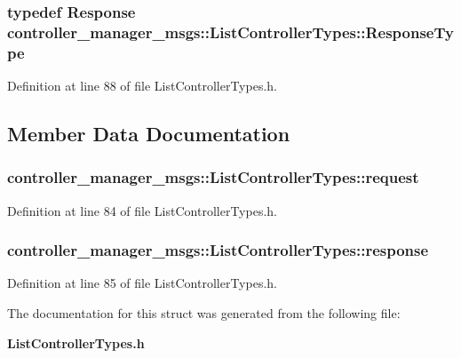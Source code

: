 \subsubsection[{\-Response\-Type}]{\setlength{\rightskip}{0pt plus 5cm}typedef {\bf \-Response} {\bf controller\-\_\-manager\-\_\-msgs\-::\-List\-Controller\-Types\-::\-Response\-Type}}\label{structcontroller__manager__msgs_1_1ListControllerTypes_a3de22e026efaa9f607bea6878ae0cb2e}


\-Definition at line 88 of file \-List\-Controller\-Types.\-h.



\subsection{\-Member \-Data \-Documentation}
\subsubsection[{request}]{ {\bf controller\-\_\-manager\-\_\-msgs\-::\-List\-Controller\-Types\-::request}}\label{structcontroller__manager__msgs_1_1ListControllerTypes_ab8b9a0c0d6d50393009975226e73eb8d}


\-Definition at line 84 of file \-List\-Controller\-Types.\-h.

\subsubsection[{response}]{ {\bf controller\-\_\-manager\-\_\-msgs\-::\-List\-Controller\-Types\-::response}}\label{structcontroller__manager__msgs_1_1ListControllerTypes_ae1536ebfb21ff16e86050bfe06ed368c}


\-Definition at line 85 of file \-List\-Controller\-Types.\-h.



\-The documentation for this struct was generated from the following file\-:\begin{DoxyCompactItemize}
\item 
{\bf \-List\-Controller\-Types.\-h}\end{DoxyCompactItemize}
